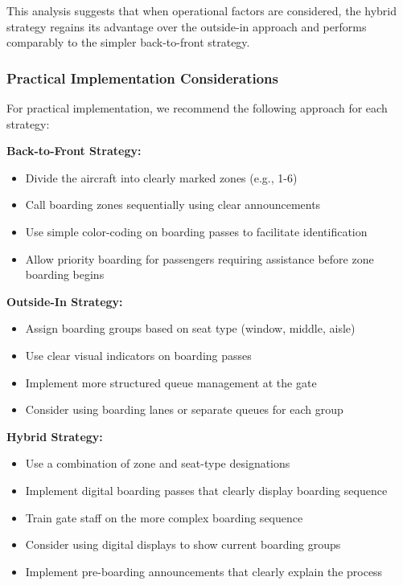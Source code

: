 This analysis suggests that when operational factors are considered, the hybrid strategy regains its advantage over the outside-in approach and performs comparably to the simpler back-to-front strategy.

\subsubsection{Practical Implementation Considerations}

For practical implementation, we recommend the following approach for each strategy:

\textbf{Back-to-Front Strategy:}
\begin{itemize}
    \item Divide the aircraft into clearly marked zones (e.g., 1-6)
    \item Call boarding zones sequentially using clear announcements
    \item Use simple color-coding on boarding passes to facilitate identification
    \item Allow priority boarding for passengers requiring assistance before zone boarding begins
\end{itemize}

\textbf{Outside-In Strategy:}
\begin{itemize}
    \item Assign boarding groups based on seat type (window, middle, aisle)
    \item Use clear visual indicators on boarding passes
    \item Implement more structured queue management at the gate
    \item Consider using boarding lanes or separate queues for each group
\end{itemize}

\textbf{Hybrid Strategy:}
\begin{itemize}
    \item Use a combination of zone and seat-type designations
    \item Implement digital boarding passes that clearly display boarding sequence
    \item Train gate staff on the more complex boarding sequence
    \item Consider using digital displays to show current boarding groups
    \item Implement pre-boarding announcements that clearly explain the process
\end{itemize}

